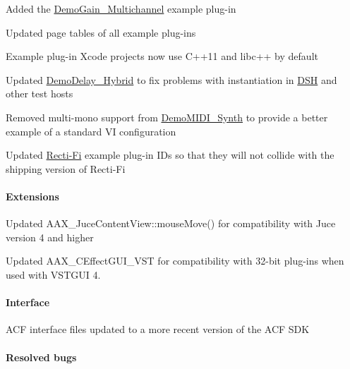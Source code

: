 \begin{DoxyItemize}
\item Added the \mbox{\hyperlink{a00848_DemoGain_Multichannel}{Demo\+Gain\+\_\+\+Multichannel}} example plug-\/in 
\item Updated page tables of all example plug-\/ins 
\item Example plug-\/in Xcode projects now use C++11 and libc++ by default 
\item Updated \mbox{\hyperlink{a00848_DemoDelay_Hybrid}{Demo\+Delay\+\_\+\+Hybrid}} to fix problems with instantiation in \mbox{\hyperlink{a00835}{D\+SH}} and other test hosts 
\item Removed multi-\/mono support from \mbox{\hyperlink{a00848_DemoMIDI_Synth}{Demo\+M\+I\+D\+I\+\_\+\+Synth}} to provide a better example of a standard VI configuration 
\item Updated \mbox{\hyperlink{a00848_RectiFi}{Recti-\/\+Fi}} example plug-\/in I\+Ds so that they will not collide with the shipping version of Recti-\/\+Fi 
\end{DoxyItemize}\hypertarget{a00847_aax_sdk_2p2p2_Extensions}{}\paragraph{Extensions}\label{a00847_aax_sdk_2p2p2_Extensions}

\begin{DoxyItemize}
\item Updated {\ttfamily A\+A\+X\+\_\+\+Juce\+Content\+View\+::mouse\+Move()} for compatibility with Juce version 4 and higher 
\item Updated {\ttfamily A\+A\+X\+\_\+\+C\+Effect\+G\+U\+I\+\_\+\+V\+ST} for compatibility with 32-\/bit plug-\/ins when used with V\+S\+T\+G\+UI 4. 
\end{DoxyItemize}\hypertarget{a00847_aax_sdk_2p2p2_Interface}{}\paragraph{Interface}\label{a00847_aax_sdk_2p2p2_Interface}

\begin{DoxyItemize}
\item A\+CF interface files updated to a more recent version of the A\+CF S\+DK 
\end{DoxyItemize}\hypertarget{a00847_aax_sdk_2p2p2_ResolvedBugs}{}\paragraph{Resolved bugs}\label{a00847_aax_sdk_2p2p2_ResolvedBugs}


